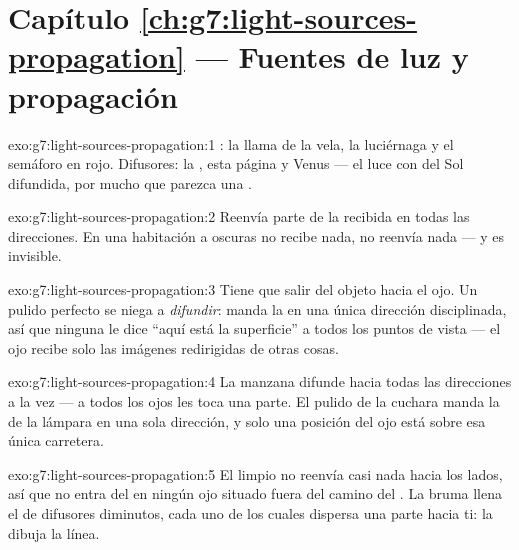 \section*{Capítulo \ref{ch:g7:light-sources-propagation} --- Fuentes de luz y propagación}

\begin{solution}{exo:g7:light-sources-propagation:1}
: la llama de la vela, la luciérnaga y el
semáforo en rojo. Difusores: la , esta página y Venus --- el
 luce con  del Sol difundida, por mucho que parezca una
.
\end{solution}

\begin{solution}{exo:g7:light-sources-propagation:2}
Reenvía parte de la  recibida en todas las direcciones. En una
habitación a oscuras no recibe nada, no reenvía nada --- y es
invisible.
\end{solution}

\begin{solution}{exo:g7:light-sources-propagation:3}
Tiene que salir  del objeto hacia el ojo. Un pulido perfecto se
niega a \emph{difundir}: manda la  en una única dirección
disciplinada, así que ninguna  le dice ``aquí está la
superficie'' a todos los puntos de vista --- el ojo recibe solo las
imágenes redirigidas de otras cosas.
\end{solution}

\begin{solution}{exo:g7:light-sources-propagation:4}
La manzana difunde hacia todas las direcciones a la vez --- a todos
los ojos les toca una parte. El pulido de la cuchara manda la
 de la lámpara en una sola dirección, y solo una posición del
ojo está sobre esa única carretera.
\end{solution}

\begin{solution}{exo:g7:light-sources-propagation:5}
El  limpio no reenvía casi nada hacia los lados, así que no
entra  del  en ningún ojo situado fuera del camino del
. La bruma llena el  de difusores diminutos, cada uno
de los cuales dispersa una parte hacia ti: la  dibuja la
línea.
\end{solution}

